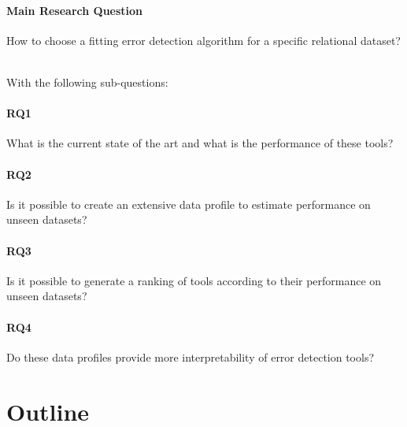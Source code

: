 \paragraph{Main Research Question} How to choose a fitting error detection algorithm for a specific relational dataset?

~\\With the following sub-questions:
\paragraph{RQ1} What is the current state of the art and what is the performance of these tools?

\paragraph{RQ2} Is it possible to create an extensive data profile to estimate performance on unseen datasets?

\paragraph{RQ3} Is it possible to generate a ranking of tools according to their performance on unseen datasets?

\paragraph{RQ4} Do these data profiles provide more interpretability of error detection tools?


\section{Outline}
\label{sec:outline}
